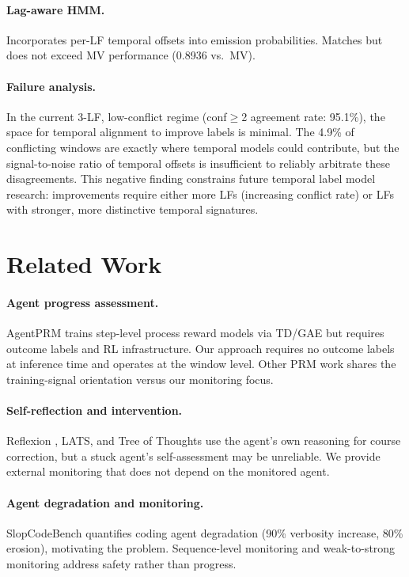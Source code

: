 \documentclass[11pt]{article}
\begin{document}
\paragraph{Lag-aware HMM.} Incorporates per-LF temporal offsets into emission probabilities.
Matches but does not exceed MV performance (0.8936 vs.\ MV).

\paragraph{Failure analysis.} In the current 3-LF, low-conflict regime (conf$\geq$2 agreement rate: 95.1\%), the space for temporal alignment to improve labels is minimal.
The 4.9\% of conflicting windows are exactly where temporal models could contribute, but the signal-to-noise ratio of temporal offsets is insufficient to reliably arbitrate these disagreements.
This negative finding constrains future temporal label model research: improvements require either more LFs (increasing conflict rate) or LFs with stronger, more distinctive temporal signatures.

\section{Related Work}
\label{sec:related}

\paragraph{Agent progress assessment.}
AgentPRM \citep{agentprm2026} trains step-level process reward models via TD/GAE but requires outcome labels and RL infrastructure.
Our approach requires no outcome labels at inference time and operates at the window level.
Other PRM work \citep{prm2025,toolprmbench2026,trajreward2026} shares the training-signal orientation versus our monitoring focus.

\paragraph{Self-reflection and intervention.}
Reflexion \citep{shinn2023reflexion}, LATS, and Tree of Thoughts \citep{yao2024tree} use the agent's own reasoning for course correction, but a stuck agent's self-assessment may be unreliable.
We provide external monitoring that does not depend on the monitored agent.

\paragraph{Agent degradation and monitoring.}
SlopCodeBench \citep{slopcodebench2026} quantifies coding agent degradation (90\% verbosity increase, 80\% erosion), motivating the problem.
Sequence-level monitoring \citep{iclr2025monitoring} and weak-to-strong monitoring \citep{weaktostrong2025} address safety rather than progress.
\end{document}
